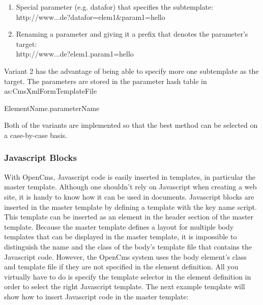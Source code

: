 \begin{enumerate}
\item Special parameter (e.g. datafor) that specifies the subtemplate:\\
http://www...de?datafor=elem1\&param1=hello

\item Renaming a parameter and giving it a prefix that denotes the
parameter's target:\\
http://www...de?elem1.param1=hello
\end{enumerate}

Variant 2 has the advantage of being able to specify more one
subtemplate as the target. The parameters are stored in the parameter
hash table in as:{\class CmsXmlFormTemplateFile}

{\code ElementName.parameterName}

Both of the variants are implemented so that the best method can be
selected on a case-by-case basis.

\subsubsection{Javascript Blocks}
With OpenCms, Javascript code is easily inserted in templates, in
particular the master template. Although one shouldn't rely on
Javascript when creating a web site, it is handy to know how it can be
used in documents. Javascript blocks are inserted in the master
template by defining a template with the key name {\name script.} This
template can be inserted as an element in the header section of the
master template. Because the master template defines a layout for
multiple body templates that can be displayed in the master template,
it is impossible to distinguish the name and the class of the body's
template file that contains the Javascript code.
However, the OpenCms system uses the body element's class and template
file if they are not specified in the element definition. All you
virtually have to do is specify the {\name template selector} in the element
definition in order to select the right Javascript template. The next
example template will show how to insert Javascript code in the master
template:

